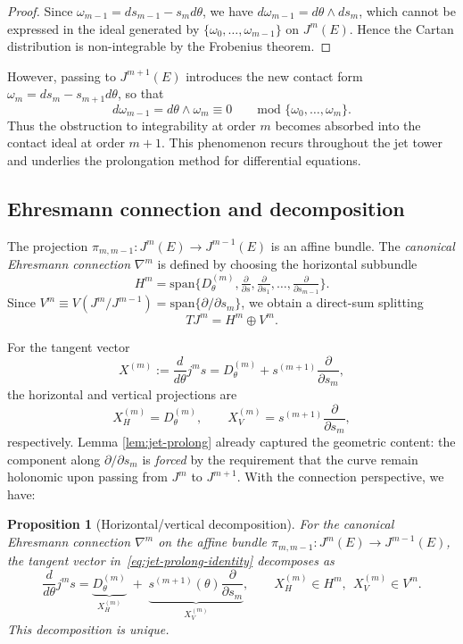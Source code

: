 \documentclass[3p,times]{elsarticle}
\newtheorem{proposition}{Proposition}[section]
\begin{document}
\begin{proof}
Since
$\omega_{m-1}=ds_{m-1}-s_m d\theta$, we have $d\omega_{m-1}=d\theta\wedge ds_m$, which
cannot be expressed in the ideal generated by $\{\omega_0,\dots,\omega_{m-1}\}$ on $J^{m}(E)$.
Hence the Cartan distribution is non-integrable by the Frobenius theorem.
\end{proof}

However, passing to $J^{m+1}(E)$ introduces the new contact form $\omega_m=ds_m-s_{m+1}d\theta$, so that
\[
 d\omega_{m-1}
   = d\theta\wedge \omega_m
   \equiv 0
   \qquad \text{mod } \{\omega_0,\ldots,\omega_m\}.
\]
Thus the obstruction to integrability at order $m$ becomes absorbed into the contact ideal at order $m+1$.
This phenomenon recurs throughout the jet tower and underlies the prolongation method for differential
equations.

\subsection{Ehresmann connection and decomposition}

The projection $\pi_{m,m-1}:J^{m}(E)\to J^{m-1}(E)$ is an affine bundle.
The {\em canonical Ehresmann connection} $\nabla^{m}$ is defined by choosing the horizontal subbundle
\[
 H^{m}
   = \mathrm{span}\big\{
      D^{(m)}_{\theta},
      \tfrac{\partial}{\partial s},
      \tfrac{\partial}{\partial s_1},
      \ldots,
      \tfrac{\partial}{\partial s_{m-1}}
    \big\}.
\]
Since $V^{m}\equiv V(J^{m}/J^{m-1})=\mathrm{span}\{\partial/\partial s_m\}$,
we obtain a direct-sum splitting
\[
 TJ^{m}=H^{m}\oplus V^{m}.
\]

For the tangent vector
\[
 X^{(m)}:=\frac{d}{d\theta}j^{m}s
 = D^{(m)}_{\theta}
   + s^{(m+1)}\frac{\partial}{\partial s_m},
\]
the horizontal and vertical projections are
\[
 X^{(m)}_H = D^{(m)}_{\theta},\qquad
 X^{(m)}_V = s^{(m+1)}\frac{\partial}{\partial s_m},
\]
respectively.
Lemma \ref{lem:jet-prolong} already captured the geometric content: the component along $\partial/\partial s_m$ is
\emph{forced} by the requirement that the curve remain holonomic upon passing from $J^{m}$ to $J^{m+1}$. With the connection perspective, we have:

\begin{proposition}[Horizontal/vertical decomposition]
\label{prop:horiz-vert}
For the canonical Ehresmann connection $\nabla^{m}$ on the affine bundle 
$\pi_{m,m-1}:J^{m}(E)\to J^{m-1}(E)$, the tangent vector in~\eqref{eq:jet-prolong-identity} decomposes as
\[
\frac{d}{d\theta} j^{m}s
=
\underbrace{D^{(m)}_\theta}_{X^{(m)}_H}
\;+\;
\underbrace{s^{(m+1)}(\theta)\frac{\partial}{\partial s_m}}_{X^{(m)}_V},
\qquad
X^{(m)}_H\in H^{m},\ \ X^{(m)}_V\in V^{m}.
\]
This decomposition is unique.
\end{proposition}
\end{document}
